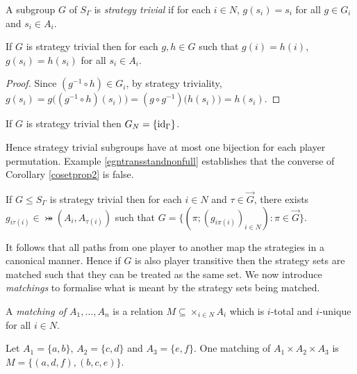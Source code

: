 \begin{definition}
	A subgroup $G$ of $S_{\Gamma}$ is \textit{strategy trivial} \cite{NoahXE} if for each $i \in N$, $g(s_i) = s_i$ for all $g \in G_i$ and $s_i \in A_i$. 
\end{definition}

\begin{lemma} \label{NoahLemma} \cite{NoahXE}
	If $G$ is strategy trivial then for each $g, h \in G$ such that $g(i) = h(i)$, $g(s_i) = h(s_i)$ for all $s_i \in A_i$.
	\begin{proof}
		Since $(g^{-1} \circ h) \in G_i$, by strategy triviality, $g(s_i) = g\bigl((g^{-1} \circ h)(s_i)\bigr) = (g \circ g^{-1})\bigl(h(s_i)\bigr) = h(s_i)$.
	\end{proof}
\end{lemma}

\begin{corollary} \label{cosetprop2}
	If $G$ is strategy trivial then $G_N = \{\text{id}_{\Gamma}\}$.
\end{corollary}

Hence strategy trivial subgroups have at most one bijection for each player permutation. Example \ref{egntransstandnonfull} establishes that the converse of Corollary \ref{cosetprop2} is false.

\begin{corollary} \label{NoahCor} 
	If $G \leq S_{\Gamma}$ is strategy trivial then for each $i \in N$ and $\tau \in \overrightarrow{G}$, there exists $g_{i\tau(i)} \in \bij(A_i, A_{\tau(i)})$ such that $G = \{(\pi; (g_{i\pi(i)})_{i \in N}): \pi \in \overrightarrow{G}\}$.
\end{corollary}

It follows that all paths from one player to another map the strategies in a canonical manner. Hence if $G$ is also player transitive then the strategy sets are matched such that they can be treated as the same set. We now introduce \textit{matchings} to formalise what is meant by the strategy sets being matched.

\begin{definition}
	A \textit{matching of $A_1, \ldots, A_n$} is a relation $M \subseteq \times_{i \in N} A_i$ which is $i$-total and $i$-unique for all $i \in N$. 
\end{definition}

\begin{example} \label{matchingeg}
Let $A_1 = \{a, b\}$, $A_2 = \{c, d\}$ and $A_3 = \{e, f\}$. One matching of $A_1 \times A_2 \times A_3$ is $M = \{(a,d,f), (b,c,e)\}$.
\begin{center}
\end{center}
\end{example}

